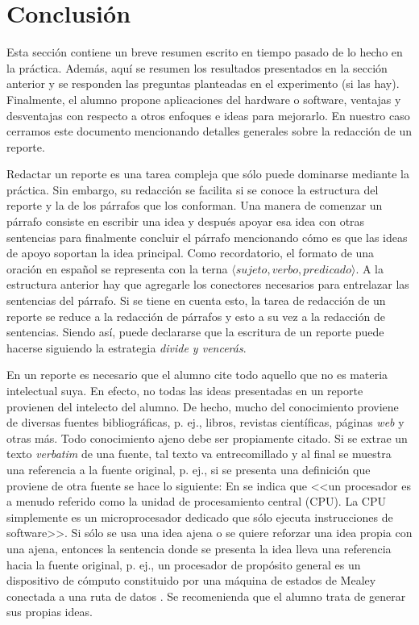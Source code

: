 \documentclass[10pt, twocolumn]{article}
\begin{document}
\section{Conclusión}\label{sec:conclusion}

Esta sección contiene un breve resumen escrito en tiempo pasado de lo hecho en la práctica. Además, aquí se resumen los resultados presentados en la sección anterior y se responden las preguntas planteadas en el experimento (si las hay). Finalmente, el alumno propone aplicaciones del hardware o software, ventajas y desventajas con respecto a otros enfoques e ideas para mejorarlo. En nuestro caso cerramos este documento mencionando detalles generales sobre la redacción de un reporte.

Redactar un reporte es una tarea compleja que sólo puede dominarse mediante la práctica. Sin embargo, su redacción se facilita si se conoce la estructura del reporte y la de los párrafos que los conforman. Una manera de comenzar un párrafo consiste en escribir una idea y después apoyar esa idea con otras sentencias para finalmente concluir el párrafo mencionando cómo es que las ideas de apoyo soportan la idea principal. Como recordatorio, el formato de una oración en español se representa con la terna $\langle sujeto,verbo,predicado \rangle$. A la estructura anterior hay que agregarle los conectores necesarios para entrelazar las sentencias del párrafo. Si se tiene en cuenta esto, la tarea de redacción de un reporte se reduce a la redacción de párrafos y esto a su vez a la redacción de sentencias. Siendo así, puede declararse que la escritura de un reporte puede hacerse siguiendo la estrategia \textit{divide y vencerás}.

En un reporte es necesario que el alumno cite todo aquello que no es materia intelectual suya. En efecto, no todas las ideas presentadas en un reporte provienen del intelecto del alumno. De hecho, mucho del conocimiento proviene de diversas fuentes bibliográficas, p. ej., libros, revistas científicas, páginas \textit{web} y otras más. Todo conocimiento ajeno debe ser propiamente citado. Si se extrae un texto \textit{verbatim} de una fuente, tal texto va entrecomillado y al final se muestra una referencia a la fuente original, p. ej., si se presenta una definición que proviene de otra fuente se hace lo siguiente: En \cite{HwEn05} se indica que <<un procesador es a menudo referido como la unidad de procesamiento central (CPU). La CPU simplemente es un microprocesador dedicado que sólo ejecuta instrucciones de software>>. Si sólo se usa una idea ajena o se quiere reforzar una idea propia con una ajena, entonces la sentencia donde se presenta la idea lleva una referencia hacia la fuente original, p. ej., un procesador de propósito general es un dispositivo de cómputo constituido por una máquina de estados de Mealey conectada a una ruta de datos \cite{HwEn05,MuMi07,StWi13}. Se recomenienda que el alumno trata de generar sus propias ideas.
\end{document}
